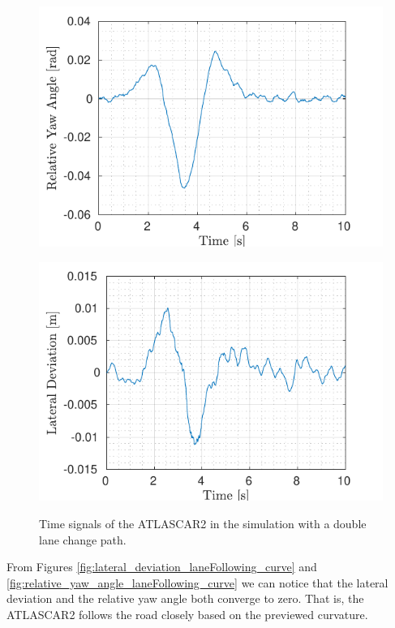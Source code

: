 \begin{figure}[!h]
\begin{minipage}[t]{0.5\textwidth}
		\includegraphics[width=\textwidth]{../../MATLAB/lane_following_curve/figure/RelativeYawAngleVsTime_curve.pdf}
		\label{fig:relative_yaw_angle_laneFollowing_curve}
	\end{minipage}
	\begin{minipage}[t]{0.5\textwidth}
		\includegraphics[width=\textwidth]{../../MATLAB/lane_following_curve/figure/LateralDeviationVsTime_curve.pdf}
		\label{fig:lateral_deviation_laneFollowing_curve}
	\end{minipage}
	\caption{Time signals of the ATLASCAR2 in the simulation with a double lane change
		 path.}
	\label{fig:laneFollowing_signals_curve}
\end{figure}
From Figures \ref{fig:lateral_deviation_laneFollowing_curve} and \ref{fig:relative_yaw_angle_laneFollowing_curve} we can notice that the lateral deviation and the relative yaw angle both converge to zero. That is, the ATLASCAR2 follows the road closely based on the previewed curvature.
\newpage

